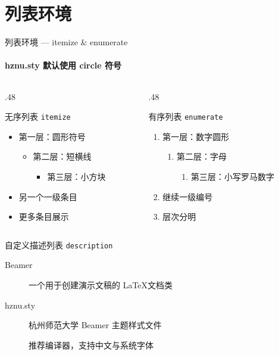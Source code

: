 \documentclass[10pt,aspectratio=169]{beamer}
\begin{document}
\section{列表环境}
\begin{frame}{列表环境 — itemize \& enumerate}
  \framesubtitle{hznu.sty 默认使用 circle 符号}

  \begin{columns}[T]
    \begin{column}{.48\textwidth}
      \begin{block}{无序列表 \texttt{itemize}}
        \begin{itemize}
          \item 第一层：圆形符号
          \begin{itemize}
            \item 第二层：短横线
            \begin{itemize}
              \item 第三层：小方块
            \end{itemize}
          \end{itemize}
          \item 另一个一级条目
          \item 更多条目展示
        \end{itemize}
      \end{block}
    \end{column}
    \begin{column}{.48\textwidth}
      \begin{block}{有序列表 \texttt{enumerate}}
        \begin{enumerate}
          \item 第一层：数字圆形
          \begin{enumerate}
            \item 第二层：字母
            \begin{enumerate}
              \item 第三层：小写罗马数字
            \end{enumerate}
          \end{enumerate}
          \item 继续一级编号
          \item 层次分明
        \end{enumerate}
      \end{block}
    \end{column}
  \end{columns}

  \vspace{.2cm}
  \begin{block}{自定义描述列表 \texttt{description}}
    \begin{description}
      \item[Beamer] 一个用于创建演示文稿的 \LaTeX 文档类
      \item[hznu.sty] 杭州师范大学 Beamer 主题样式文件
      \item[\XeLaTeX] 推荐编译器，支持中文与系统字体
    \end{description}
  \end{block}
\end{frame}
\end{document}
